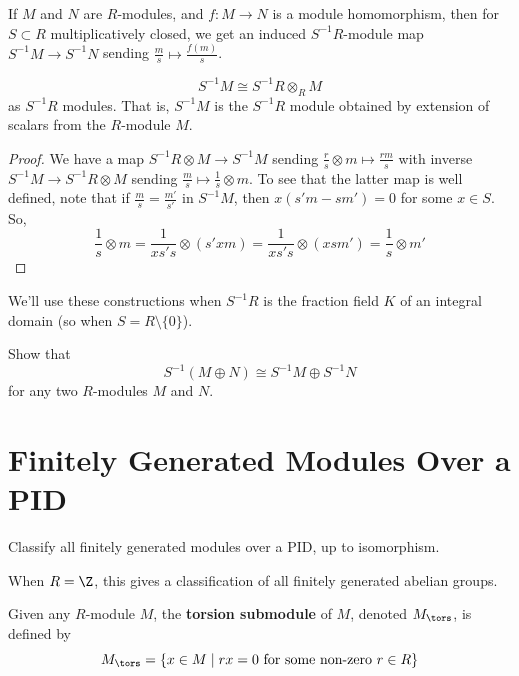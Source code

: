 \begin{thm}
    If $M$ and $N$ are $R$-modules, and $f:M \to N$ is a module homomorphism, then for $S \subset R$ multiplicatively closed, we get an induced $S^{-1}R$-module map $S^{-1}M \to S^{-1}N$ sending $\frac{m}{s} \mapsto \frac{f(m)}{s}$.
\end{thm}

\begin{prop}
    $$S^{-1}M \cong S^{-1}R \otimes _RM$$
    as $S^{-1}R$ modules. That is, $S^{-1}M$ is the $S^{-1}R$ module obtained by extension of scalars from the $R$-module $M$.
\end{prop}

\begin{proof}
    We have a map $S^{-1}R \otimes M \to S^{-1} M$ sending $\frac{r}{s}\otimes m \mapsto \frac{rm}{s}$ with inverse $S^{-1}M \to S^{-1}R \otimes M$ sending $\frac{m}{s}\mapsto \frac{1}{s}\otimes m$. To see that the latter map is well defined, note that if $\frac{m}{s}=\frac{m'}{s'}$ in $S^{-1}M$, then $x(s'm - sm')=0$ for some $x \in S$. So,
    $$\frac{1}{s}\otimes m = \frac{1}{xs's} \otimes (s'xm)=\frac{1}{xs's}\otimes (xsm')=\frac{1}{s}\otimes m'$$
\end{proof}

We'll use these constructions when $S^{-1}R$ is the fraction field $K$ of an integral domain (so when $S=R\setminus \{0\}$).

\begin{notebox*}[Exercise]
    Show that
    $$S^{-1}(M \oplus N) \cong S^{-1}M \oplus S^{-1}N$$
    for any two $R$-modules $M$ and $N$.
\end{notebox*}

\section{Finitely Generated Modules Over a PID}

\begin{notebox*}[Goal]
    Classify all finitely generated modules over a PID, up to isomorphism.
\end{notebox*}

\begin{ex}
    When $R=\Z$, this gives a classification of all finitely generated abelian groups.
\end{ex}

\begin{defn}
    Given any $R$-module $M$, the \textbf{torsion submodule} of $M$, denoted $M_{\tors}$, is defined by
    $$M_{\tors}=\{x \in M \mid rx =0 \text{ for some non-zero } r \in R\}$$
\end{defn}

